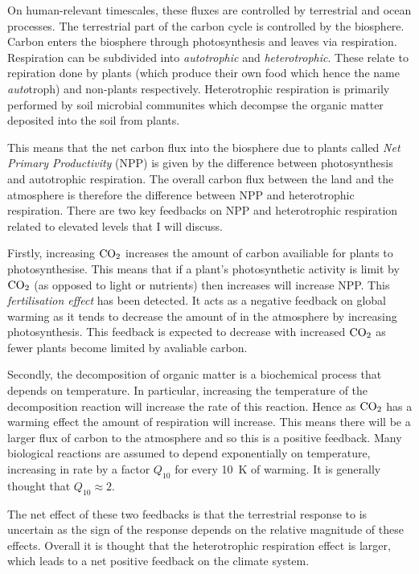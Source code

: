 On human-relevant timescales, these fluxes are controlled by terrestrial and ocean processes. The terrestrial part of the carbon cycle is controlled by the biosphere.
Carbon enters the biosphere through photosynthesis and leaves via respiration. Respiration can be subdivided into \emph{autotrophic} and \emph{heterotrophic}.
These relate to repiration done by plants (which produce their own food which hence the name \emph{auto}troph) and non-plants respectively. Heterotrophic respiration
is primarily performed by soil microbial communites which decompse the organic matter deposited into the soil from plants.

This means that the net carbon flux into the biosphere due to plants called \emph{Net Primary Productivity} (NPP) is given by the difference between photosynthesis and
autotrophic respiration. The overall carbon flux between the land and the atmosphere is therefore the difference between NPP and heterotrophic respiration. There are two key feedbacks
on NPP and heterotrophic respiration related to elevated  levels that I will discuss.

Firstly, increasing $\ce{CO2}$ increases the amount of carbon availiable for plants to photosynthesise. This means that if a plant's photosynthetic activity is limit by
$\ce{CO2}$ (as opposed to light or nutrients) then increases  will increase NPP. This \emph{ fertilisation effect} has been detected. It acts as a negative feedback
on global warming as it tends to decrease the amount of  in the atmosphere by increasing photosynthesis. This feedback is expected to decrease with increased $\ce{CO2}$ as
fewer plants become limited by avaliable carbon.

Secondly, the decomposition of organic matter is a biochemical process that depends on temperature. In particular, increasing the temperature of the decomposition reaction
will increase the rate of this reaction. Hence as $\ce{CO2}$ has a warming effect the amount of respiration will increase. This means there will be a larger flux of carbon to the
atmosphere and so this is a positive feedback. Many biological reactions are assumed to depend exponentially on temperature, increasing in rate by a factor $Q_{10}$ for every
\SI{10}{\kelvin} of warming. It is generally thought that $Q_{10} \approx 2$.

The net effect of these two feedbacks is that the terrestrial response to  is uncertain as the sign of the response depends on the relative magnitude of these effects. Overall it
is thought that the heterotrophic respiration effect is larger, which leads to a net positive feedback on the climate system.

